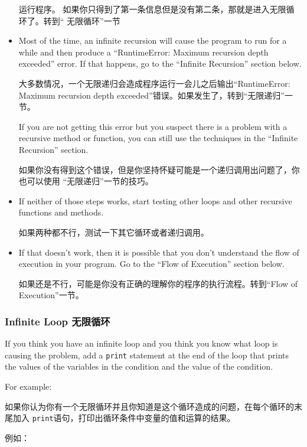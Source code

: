 \documentclass[10pt]{book}
\begin{document}
\begin{CJK}{UTF8}{gbsn}
\begin{itemize}
运行程序。 如果你只得到了第一条信息但是没有第二条，那就是进入无限循环了。转到``
无限循环''一节

\item Most of the time, an infinite recursion will cause the program
to run for a while and then produce a ``RuntimeError: Maximum
recursion depth exceeded'' error.  If that happens, go to the
``Infinite Recursion'' section below.

大多数情况，一个无限递归会造成程序运行一会儿之后输出``RuntimeError: Maximum
recursion depth exceeded''错误。如果发生了，转到``无限递归''一节。

If you are not getting this error but you suspect there is a problem
with a recursive method or function, you can still use the techniques
in the ``Infinite Recursion'' section.

如果你没有得到这个错误，但是你坚持怀疑可能是一个递归调用出问题了，你也可以使用
``无限递归''一节的技巧。

\item If neither of those steps works, start testing other
loops and other recursive functions and methods.

如果两种都不行，测试一下其它循环或者递归调用。

\item If that doesn't work, then it is possible that
you don't understand the flow of execution in your program.
Go to the ``Flow of Execution'' section below.

如果还是不行，可能是你没有正确的理解你的程序的执行流程。转到``Flow of Execution''一节。

\end{itemize}


\subsubsection{Infinite Loop 无限循环}

If you think you have an infinite loop and you think you know
what loop is causing the problem, add a {\tt print} statement at
the end of the loop that prints the values of the variables in
the condition and the value of the condition.

For example:

如果你认为你有一个无限循环并且你知道是这个循环造成的问题，在每个循环的末尾加入
{\tt print}语句，打印出循环条件中变量的值和运算的结果。

例如：


\end{CJK}
\end{document}
